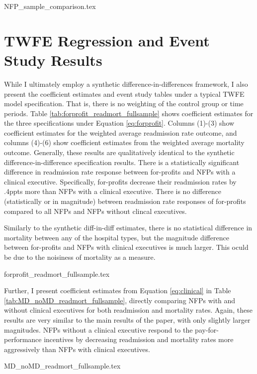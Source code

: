 \documentclass[12pt]{article}
\begin{document}
{NFP_sample_comparison.tex}





\section{TWFE Regression and Event Study Results}\label{app:fullsample}

While I ultimately employ a synthetic difference-in-differences framework, I also present the coefficient estimates and event study tables under a typical TWFE model specification. That is, there is no weighting of the control group or time periods. Table \ref{tab:forprofit_readmort_fullsample} shows coefficient estimates for the three specifications under Equation \ref{eq:forprofit}. Columns (1)-(3) show coefficient estimates for the weighted average readmission rate outcome, and columns (4)-(6) show coefficient estimates from the weighted average mortality outcome. Generally, these results are qualitatively identical to the synthetic difference-in-difference specification results. There is a statistically significant difference in readmission rate response between for-profits and NFPs with a clinical executive. Specifically, for-profits decrease their readmission rates by .4ppts more than NFPs with a clinical executive. There is no difference (statistically or in magnitude) between readmission rate responses of for-profits compared to all NFPs and NFPs without clincal executives. 

Similarly to the synthetic diff-in-diff estimates, there is no statistical difference in mortality between any of the hospital types, but the magnitude difference between for-profits and NFPs with clinical executives is much larger. This oculd be due to the noisiness of mortality as a measure. 

{forprofit_readmort_fullsample.tex}

Further, I present coefficient estimates from Equation \ref{eq:clinical} in Table \ref{tab:MD_noMD_readmort_fullsample}, directly comparing NFPs with and without clinical executives for both readmission and mortality rates. Again, these results are very similar to the main results of the paper, with only slightly larger magnitudes. NFPs without a clinical executive respond to the pay-for-performance incentives by decreasing readmission and mortality rates more aggressively than NFPs with clinical executives. 

{MD_noMD_readmort_fullsample.tex}
\end{document}
